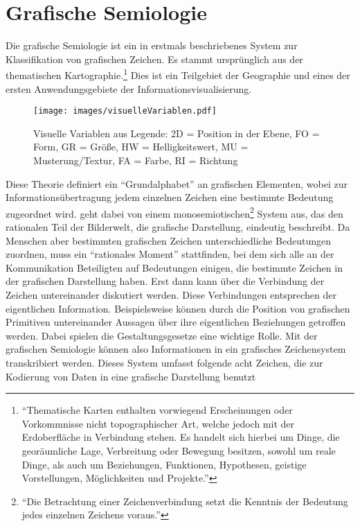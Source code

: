 \documentclass[a4paper, 
               12pt,
               DIV=calc,
               version=first,
               pdftex,
               headsepline,
               footsepline,
               bibtotocnumbered,
               liststotocnumbered]{scrreprt}
\begin{document}
\section{Grafische Semiologie}
\label{sec:grafischeSemiologie}
Die grafische Semiologie ist ein in \citep{Bertin} erstmals beschriebenes System zur Klassifikation von grafischen Zeichen.
Es stammt ursprünglich aus der thematischen Kartographie.\footnote{"`Thematische Karten enthalten vorwiegend
Erscheinungen oder Vorkommnisse nicht topographischer Art, welche jedoch mit der Erdoberfläche in Verbindung
stehen. Es handelt sich hierbei um Dinge, die georäumliche Lage, Verbreitung oder Bewegung besitzen, sowohl
um reale Dinge, als auch um Beziehungen, Funktionen, Hypothesen, geistige Vorstellungen, Möglichkeiten und
Projekte."'\citep{Gitta} } Dies ist ein Teilgebiet der Geographie und eines der ersten Anwendungsgebiete der
Informationsvisualisierung.
\begin{figure}
\centering
\texttt{[image: images/visuelleVariablen.pdf]}
\caption{Visuelle Variablen aus \citep[S.\,51]{Bertin} Legende: 2D = Position in der Ebene, FO = Form, GR = Größe,
HW = Helligkeitswert, MU = Musterung/Textur, FA = Farbe, RI = Richtung}
\label{fig:visuelleVariablen}
\end{figure}
Diese Theorie definiert ein "`Grundalphabet"' an grafischen Elementen, wobei zur Informationsübertragung
jedem einzelnen Zeichen eine bestimmte Bedeutung zugeordnet wird. \citep{Bertin} geht dabei von einem
monosemiotischen\footnote{"`Die Betrachtung einer Zeichenverbindung setzt die Kenntnis der Bedeutung jedes
einzelnen Zeichens voraus."'\citep[S.\,3]{Bertin}} System aus, das den rationalen Teil der Bilderwelt, die
grafische Darstellung, eindeutig beschreibt.
Da Menschen aber bestimmten grafischen Zeichen unterschiedliche Bedeutungen zuordnen, muss ein "`rationales Moment"'
stattfinden, bei dem sich alle an der Kommunikation Beteiligten auf Bedeutungen einigen,
die bestimmte Zeichen in der grafischen Darstellung haben. Erst dann kann über die Verbindung der Zeichen untereinander diskutiert
werden. Diese Verbindungen entsprechen der eigentlichen Information. Beispielsweise können
durch die Position von grafischen Primitiven untereinander Aussagen über ihre eigentlichen Beziehungen getroffen werden.
Dabei spielen die Gestaltungsgesetze eine wichtige Rolle.
Mit der grafischen Semiologie können also Informationen in ein grafisches Zeichensystem
transkribiert werden. Dieses System umfasst folgende acht Zeichen, die zur Kodierung von Daten in eine grafische Darstellung benutzt
\end{document}
